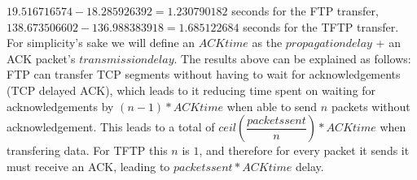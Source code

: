 $19.516716574 - 18.285926392 = 1.230790182$ seconds for the FTP transfer, $138.673506602 - 136.988383918 = 1.685122684$ seconds for the TFTP transfer. For simplicity's sake we will define an $ACK time$ as the $propagation delay$ + an ACK packet's $transmission delay$. The results above can be explained as follows: FTP can transfer TCP segments without having to wait for acknowledgements (TCP delayed ACK), which leads to it reducing time spent on waiting for acknowledgements by $(n-1) * ACK time$ when able to send $n$ packets without acknowledgement. This leads to a total of $ceil(\dfrac{packets sent}{n}) * ACK time$ when transfering data. For TFTP this $n$ is $1$, and therefore for every packet it sends it must receive an ACK, leading to $packets sent * ACK time$ delay.